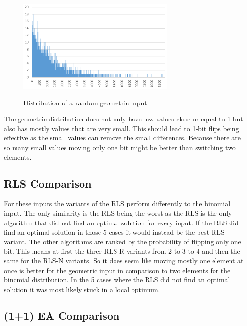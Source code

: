 \begin{figure}[h]
      \caption{Distribution of a random geometric input}
      \centering
      \includegraphics[width=0.7\textwidth]{figures/images/numberGenerator/geometricDistributionForp0_001.png}\label{fig:geoDistExample}
\end{figure}

The geometric distribution does not only have low values close or equal to 1 but also has mostly values that are very small.
This should lead to 1-bit flips being effective as the small values can remove the small differences. Because there are so many small values moving only one bit might be better than switching two elements.  
\subsection{RLS Comparison}




For these inputs the variants of the RLS perform differently to the binomial input.
The only similarity is the RLS being the worst as the RLS is the only algorithm that did not find an optimal solution for every input.
If the RLS did find an optimal solution in those 5 cases it would instead be the best RLS variant.
The other algorithms are ranked by the probability of flipping only one bit.
This means at first the three RLS-R variants from 2 to 3 to 4 and then the same for the RLS-N variants.
So it does seem like moving mostly one element at once is better for the geometric input in comparison to two elements for the binomial distribution.
In the 5 cases where the RLS did not find an optimal solution it was most likely stuck in a local optimum.

\subsection{(1+1) EA Comparison}




